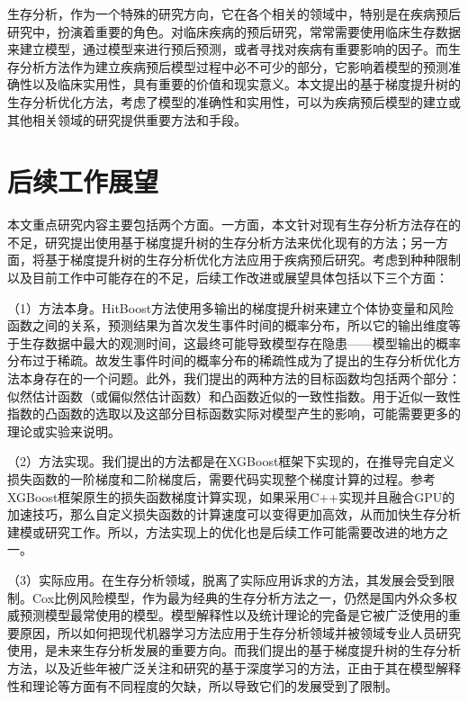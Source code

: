 生存分析，作为一个特殊的研究方向，它在各个相关的领域中，特别是在疾病预后研究中，扮演着重要的角色。对临床疾病的预后研究，常常需要使用临床生存数据来建立模型，通过模型来进行预后预测，或者寻找对疾病有重要影响的因子。而生存分析方法作为建立疾病预后模型过程中必不可少的部分，它影响着模型的预测准确性以及临床实用性，具有重要的价值和现实意义。本文提出的基于梯度提升树的生存分析优化方法，考虑了模型的准确性和实用性，可以为疾病预后模型的建立或其他相关领域的研究提供重要方法和手段。

\section{后续工作展望}
本文重点研究内容主要包括两个方面。一方面，本文针对现有生存分析方法存在的不足，研究提出使用基于梯度提升树的生存分析方法来优化现有的方法；另一方面，将基于梯度提升树的生存分析优化方法应用于疾病预后研究。考虑到种种限制以及目前工作中可能存在的不足，后续工作改进或展望具体包括以下三个方面：

（1）方法本身。HitBoost方法使用多输出的梯度提升树来建立个体协变量和风险函数之间的关系，预测结果为首次发生事件时间的概率分布，所以它的输出维度等于生存数据中最大的观测时间，这最终可能导致模型存在隐患——模型输出的概率分布过于稀疏。故发生事件时间的概率分布的稀疏性成为了提出的生存分析优化方法本身存在的一个问题。此外，我们提出的两种方法的目标函数均包括两个部分：似然估计函数（或偏似然估计函数）和凸函数近似的一致性指数。用于近似一致性指数的凸函数的选取以及这部分目标函数实际对模型产生的影响，可能需要更多的理论或实验来说明。

（2）方法实现。我们提出的方法都是在XGBoost框架下实现的，在推导完自定义损失函数的一阶梯度和二阶梯度后，需要代码实现整个梯度计算的过程。参考XGBoost框架原生的损失函数梯度计算实现，如果采用C++实现并且融合GPU的加速技巧，那么自定义损失函数的计算速度可以变得更加高效，从而加快生存分析建模或研究工作。所以，方法实现上的优化也是后续工作可能需要改进的地方之一。

（3）实际应用。在生存分析领域，脱离了实际应用诉求的方法，其发展会受到限制。Cox比例风险模型，作为最为经典的生存分析方法之一，仍然是国内外众多权威预测模型最常使用的模型。模型解释性以及统计理论的完备是它被广泛使用的重要原因，所以如何把现代机器学习方法应用于生存分析领域并被领域专业人员研究使用，是未来生存分析发展的重要方向。而我们提出的基于梯度提升树的生存分析方法，以及近些年被广泛关注和研究的基于深度学习的方法，正由于其在模型解释性和理论等方面有不同程度的欠缺，所以导致它们的发展受到了限制。
